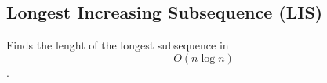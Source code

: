 \subsection{Longest Increasing Subsequence (LIS)}

Finds the lenght of the longest subsequence in $$O(n \log{n})$$.
